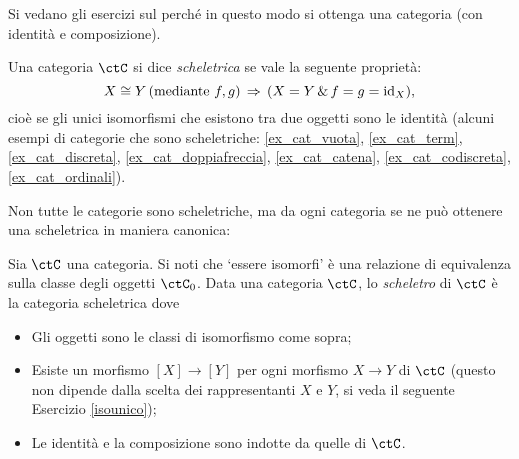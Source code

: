 Si vedano gli esercizi sul perché in questo modo si ottenga una categoria (con identità e composizione).
\begin{example}\label{mongruppi_liberi}
\end{example}
\begin{definition}\label{def_cat_scheletrica}
	Una categoria \(\ctC\) si dice \emph{scheletrica} se vale la seguente proprietà:
	\[X\cong Y \, (\text{mediante } f,g) \,\Rightarrow\, (X=Y \,\&\, f=g=\mathrm{id}_X),\]
	cioè se gli unici isomorfismi che esistono tra due oggetti sono le identità (alcuni esempi di categorie che sono scheletriche: \ref{ex_cat_vuota}, \ref{ex_cat_term}, \ref{ex_cat_discreta}, \ref{ex_cat_doppiafreccia}, \ref{ex_cat_catena}, \ref{ex_cat_codiscreta}, \ref{ex_cat_ordinali}).
\end{definition}

Non tutte le categorie sono scheletriche, ma da ogni categoria se ne può ottenere una scheletrica in maniera canonica:

\begin{definition}\label{def_scheletro}
	Sia \(\ctC\) una categoria.	Si noti che `essere isomorfi' è una relazione di equivalenza sulla classe degli oggetti \(\ctC_0\).
	Data una categoria \(\ctC\), lo \emph{scheletro} di \(\ctC\) è la categoria scheletrica dove
	\begin{itemize}
		\item Gli oggetti sono le classi di isomorfismo come sopra;
		\item Esiste un morfismo \([X]\to[Y]\) per ogni morfismo \(X\to Y\) di \(\ctC\) (questo non dipende dalla scelta dei rappresentanti \(X\) e \(Y\), si veda il seguente Esercizio \ref{isounico});
		\item Le identità e la composizione sono indotte da quelle di \(\ctC\).
	\end{itemize}
\end{definition}

